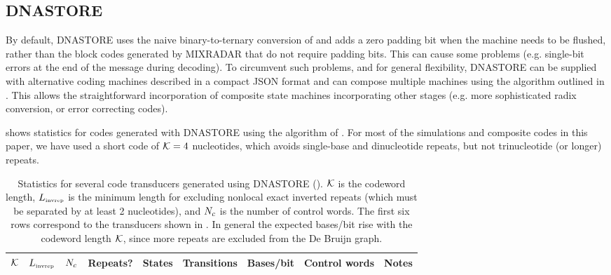 \documentclass[english]{article}
\begin{document}
%



\subsection{DNASTORE}

By default, DNASTORE uses the naive binary-to-ternary conversion of
 and adds a zero padding bit when the machine needs to be flushed,
rather than the block codes generated by MIXRADAR that do not require padding bits.
This can cause some problems (e.g. single-bit errors at the end of the message during decoding).
To circumvent such problems, and for general flexibility,
DNASTORE can be supplied with alternative coding machines described in a compact JSON format
and can compose multiple machines using the algorithm outlined in .
This allows the straightforward incorporation of composite state machines incorporating other stages
(e.g. more sophisticated radix conversion, or error correcting codes).

 shows statistics for codes generated with DNASTORE
using the algorithm of .
For most of the simulations and composite codes in this paper, we have used a short code of ${\cal K}=4$ nucleotides,
which avoids single-base and dinucleotide repeats,
but not trinucleotide (or longer) repeats.

\begin{table}
  \begin{tabular}{rrrrrrrll}
    ${\cal K}$ & $L_{\mbox{\tiny invrep}}$ & $N_c$ & Repeats? & States & Transitions & Bases/bit & Control words & Notes \\
    \hline

\end{tabular}
\caption{
  Statistics for several code transducers generated using DNASTORE ().
  ${\cal K}$ is the codeword length,
  $L_{\mbox{\tiny invrep}}$ is the minimum length for excluding nonlocal exact inverted repeats
  (which must be separated by at least 2 nucleotides),
  and $N_c$ is the number of control words.
  The first six rows correspond to the transducers shown in .
  In general the expected bases/bit rise with the codeword length ${\cal K}$,
  since more repeats are excluded from the De Bruijn graph.
}
\end{table}
\end{document}
